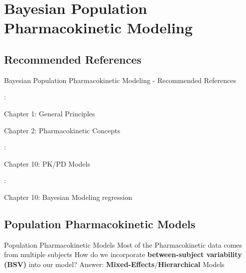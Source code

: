 
\section{Bayesian Population Pharmacokinetic Modeling}

\subsection{Recommended References}
\begin{frame}{Bayesian Population Pharmacokinetic Modeling - Recommended References}
    \begin{vfilleditems}
        \item \textcite{Gabrielsson2006PKPDbook}:
        \begin{vfilleditems}
            \item Chapter 1: General Principles
            \item Chapter 2: Pharmacokinetic Concepts
        \end{vfilleditems}
        \item \textcite{Owen2014PKPDbook}:
        \begin{vfilleditems}
            \item Chapter 10: PK/PD Models
        \end{vfilleditems}
        \item \textcite{Bonate2011PKPDbook}:
        \begin{vfilleditems}
            \item Chapter 10: Bayesian Modeling regression
        \end{vfilleditems}
        \item \textcite{margossian2022torsten}
    \end{vfilleditems}
\end{frame}

\subsection{Population Pharmacokinetic Models}
\begin{frame}{Population Pharmacokinetic Models}
    Most of the Pharmacokinetic data comes from multiple subjects
    \vfill
    How do we incorporate \textbf{between-subject variability (BSV)} into our model?
    \vfill
    Answer: \textbf{Mixed-Effects}/\textbf{Hierarchical} Models
\end{frame}

